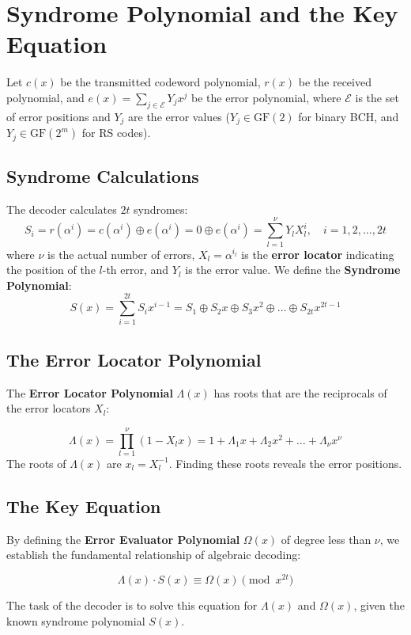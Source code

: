 \documentclass[12pt,a4paper]{article}
\begin{document}
\section{Syndrome Polynomial and the Key Equation}

Let $c(x)$ be the transmitted codeword polynomial, $r(x)$ be the received polynomial, and $e(x) = \sum_{j \in \mathcal{E}} Y_j x^j$ be the error polynomial, where $\mathcal{E}$ is the set of error positions and $Y_j$ are the error values ($Y_j \in \text{GF}(2)$ for binary BCH, and $Y_j \in \text{GF}(2^m)$ for RS codes).

\subsection{Syndrome Calculations}
The decoder calculates $2t$ syndromes:
\[ S_i = r(\alpha^i) = c(\alpha^i) \oplus e(\alpha^i) = 0 \oplus e(\alpha^i) = \sum_{l=1}^\nu Y_l X_l^i, \quad i = 1, 2, \dots, 2t \]
where $\nu$ is the actual number of errors, $X_l = \alpha^{i_l}$ is the \textbf{error locator} indicating the position of the $l$-th error, and $Y_l$ is the error value.
We define the \textbf{Syndrome Polynomial}:
\[ S(x) = \sum_{i=1}^{2t} S_i x^{i-1} = S_1 \oplus S_2 x \oplus S_3 x^2 \oplus \dots \oplus S_{2t} x^{2t-1} \]

\subsection{The Error Locator Polynomial}
The \textbf{Error Locator Polynomial} $\Lambda(x)$ has roots that are the reciprocals of the error locators $X_l$:
\begin{tcolorbox}[defbox, title={\textbf{Error Locator Polynomial}}]
\[ \Lambda(x) = \prod_{l=1}^\nu (1 - X_l x) = 1 + \Lambda_1 x + \Lambda_2 x^2 + \dots + \Lambda_\nu x^\nu \]
The roots of $\Lambda(x)$ are $x_l = X_l^{-1}$. Finding these roots reveals the error positions.
\end{tcolorbox}

\subsection{The Key Equation}
By defining the \textbf{Error Evaluator Polynomial} $\Omega(x)$ of degree less than $\nu$, we establish the fundamental relationship of algebraic decoding:
\begin{tcolorbox}[formulabox, title={\textbf{The Key Equation of Decoding}}]
\[ \Lambda(x) \cdot S(x) \equiv \Omega(x) \pmod{x^{2t}} \]
\end{tcolorbox}
The task of the decoder is to solve this equation for $\Lambda(x)$ and $\Omega(x)$, given the known syndrome polynomial $S(x)$.
\end{document}
